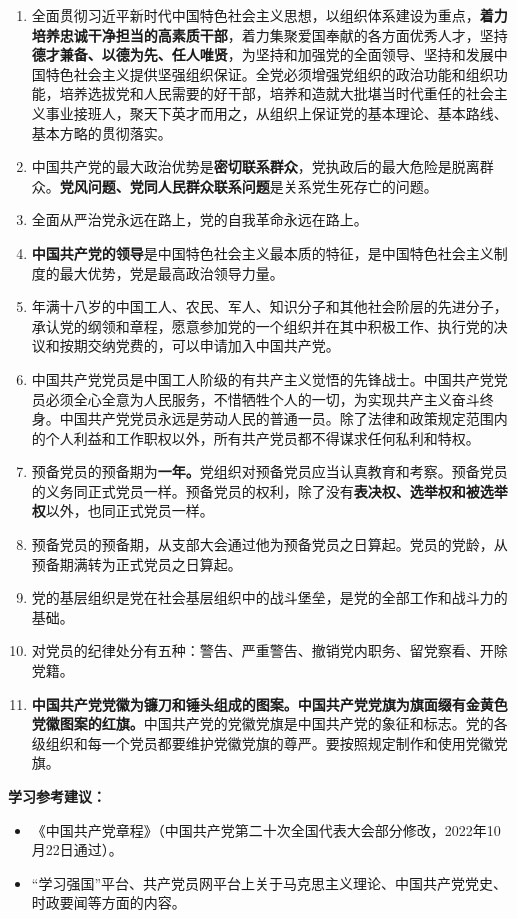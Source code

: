 \documentclass[UTF8,11pt,a4paper]{ctexart}
\begin{document}
\begin{enumerate}[label=\arabic*., leftmargin=2.3em]
\item 全面贯彻习近平新时代中国特色社会主义思想，以组织体系建设为重点，\textbf{着力培养忠诚干净担当的高素质干部}，着力集聚爱国奉献的各方面优秀人才，坚持\textbf{德才兼备、以德为先、任人唯贤}，为坚持和加强党的全面领导、坚持和发展中国特色社会主义提供坚强组织保证。全党必须增强党组织的政治功能和组织功能，培养选拔党和人民需要的好干部，培养和造就大批堪当时代重任的社会主义事业接班人，聚天下英才而用之，从组织上保证党的基本理论、基本路线、基本方略的贯彻落实。
\item 中国共产党的最大政治优势是\textbf{密切联系群众}，党执政后的最大危险是脱离群众。\textbf{党风问题、党同人民群众联系问题}是关系党生死存亡的问题。
\item 全面从严治党永远在路上，党的自我革命永远在路上。
\item \textbf{中国共产党的领导}是中国特色社会主义最本质的特征，是中国特色社会主义制度的最大优势，党是最高政治领导力量。
\item 年满十八岁的中国工人、农民、军人、知识分子和其他社会阶层的先进分子，承认党的纲领和章程，愿意参加党的一个组织并在其中积极工作、执行党的决议和按期交纳党费的，可以申请加入中国共产党。
\item 中国共产党党员是中国工人阶级的有共产主义觉悟的先锋战士。中国共产党党员必须全心全意为人民服务，不惜牺牲个人的一切，为实现共产主义奋斗终身。中国共产党党员永远是劳动人民的普通一员。除了法律和政策规定范围内的个人利益和工作职权以外，所有共产党员都不得谋求任何私利和特权。
\item 预备党员的预备期为\textbf{一年。}党组织对预备党员应当认真教育和考察。预备党员的义务同正式党员一样。预备党员的权利，除了没有\textbf{表决权、选举权和被选举权}以外，也同正式党员一样。
\item 预备党员的预备期，从支部大会通过他为预备党员之日算起。党员的党龄，从预备期满转为正式党员之日算起。
\item 党的基层组织是党在社会基层组织中的战斗堡垒，是党的全部工作和战斗力的基础。
\item 对党员的纪律处分有五种：警告、严重警告、撤销党内职务、留党察看、开除党籍。
\item \textbf{中国共产党党徽为镰刀和锤头组成的图案。中国共产党党旗为旗面缀有金黄色党徽图案的红旗。}中国共产党的党徽党旗是中国共产党的象征和标志。党的各级组织和每一个党员都要维护党徽党旗的尊严。要按照规定制作和使用党徽党旗。
\end{enumerate}

\noindent\textbf{学习参考建议：}
\begin{itemize}[leftmargin=2em,label={}]
\item 《中国共产党章程》（中国共产党第二十次全国代表大会部分修改，2022年10月22日通过）。
\item “学习强国”平台、共产党员网平台上关于马克思主义理论、中国共产党党史、时政要闻等方面的内容。
\end{itemize}
\end{document}
